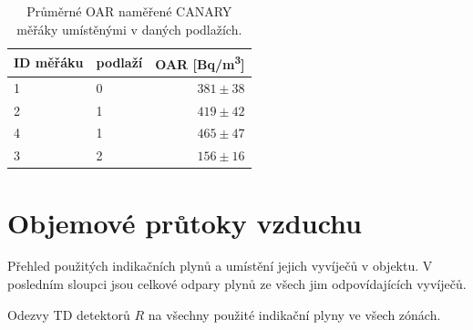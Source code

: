 \begin{table}[H]
    \centering
    \caption{Průměrné OAR naměřené CANARY měřáky umístěnými v daných podlažích.}
    \label{tab:skala75_OARprumerne_CANARY}
    \begin{tabular}{llr}
        \toprule
        ID měřáku & podlaží & OAR [\si{Bq/m^3}]\\
        \midrule
        1 & 0 & $381\pm38$\\
        2 & 1 & $419\pm42$\\
        4 & 1 & $465\pm47$\\
        3 & 2 & $156\pm16$\\
        \bottomrule
    \end{tabular}
\end{table}

\section{Objemové průtoky vzduchu}

\begin{table}[H]
    \centering
    \caption{Přehled použitých indikačních plynů a umístění jejich vyvíječů v objektu. V posledním sloupci jsou celkové odpary plynů ze všech jim odpovídajících vyvíječů.}
    \label{tab:skala75_indikacniPlyny}
    
\end{table}
\begin{table}[H]
    \centering
    \caption{Odezvy TD detektorů $R$ na všechny použité indikační plyny ve všech zónách.}
    \label{tab:skala75_odezvyTD}
    
\end{table}


